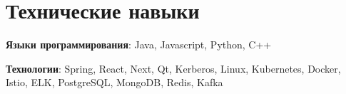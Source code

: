 

\section{Технические навыки}\label{sec:programming-skills}
\resumeSubHeadingListStart
\item{
    \textbf{Языки программирования}{: Java, Javascript, Python, C++}
}
\item{
    \textbf{Технологии}{: Spring, React, Next, Qt, Kerberos, Linux, Kubernetes, Docker, Istio, ELK, PostgreSQL, MongoDB, Redis, Kafka}
}
\resumeSubHeadingListEnd

